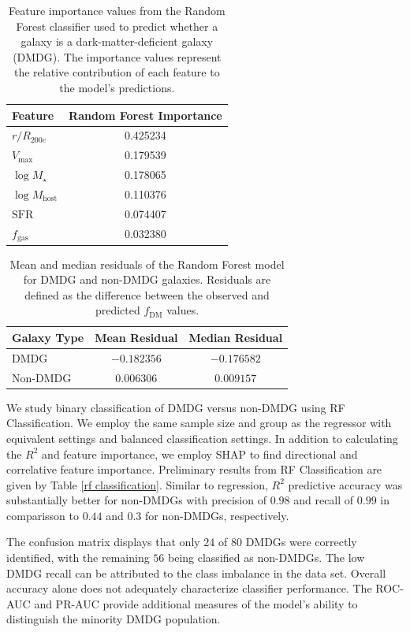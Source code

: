 \documentclass[twocolumn]{openjournal}
\begin{document}
\begin{table}[ht]
\centering
\caption{Feature importance values from the Random Forest classifier used to predict whether a galaxy is a dark-matter-deficient galaxy (DMDG). The importance values represent the relative contribution of each feature to the model's predictions.}
\label{feature importance rf}
\begin{tabular}{lc}
\hline
\textbf{Feature} & \textbf{Random Forest Importance} \\
\hline
$r/R_{200c}$ & 0.425234 \\
$V_{\max}$ & 0.179539 \\
$\log M_{\star}$ & 0.178065 \\
$\log M_{\mathrm{host}}$ & 0.110376 \\
$\mathrm{SFR}$ & 0.074407 \\
$f_{\mathrm{gas}}$ & 0.032380 \\
\hline
\end{tabular}
\end{table}
\begin{table}[ht]
\centering
\caption{Mean and median residuals of the Random Forest model for DMDG and non-DMDG galaxies. Residuals are defined as the difference between the observed and predicted $f_{\mathrm{DM}}$ values.}
\label{average residual}
\begin{tabular}{lcc}
\hline
\textbf{Galaxy Type} & \textbf{Mean Residual} & \textbf{Median Residual} \\
\hline
DMDG & $-0.182356$ & $-0.176582$ \\
Non-DMDG & $0.006306$ & $0.009157$ \\
\hline
\end{tabular}
\end{table}
We study binary classification of DMDG versus non-DMDG using RF Classification. We employ the same sample size and group as the regressor with equivalent settings and balanced classification settings. In addition to calculating the $R^2$ and feature importance, we employ SHAP to find directional and correlative feature importance. Preliminary results from RF Classification are given by Table \ref{rf classification}.  Similar to regression, $R^2$ predictive accuracy was substantially better for non-DMDGs with precision of $0.98$ and recall of $0.99$ in comparisson to $0.44$ and $0.3$ for non-DMDGs, respectively.

The confusion matrix displays that only $24$ of $80$ DMDGs were correctly identified, with the remaining $56$ being classified as non-DMDGs. The low DMDG recall can be attributed to the class imbalance in the data set. Overall accuracy alone does not adequately characterize classifier performance. The ROC-AUC and PR-AUC provide additional measures of the model's ability to distinguish the minority DMDG population.
\end{document}
